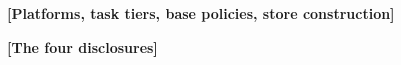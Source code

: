 \documentclass[letterpaper, 10 pt, conference]{ieeeconf}
\newcommand{\todo}[1]{\textbf{[#1]}}
\begin{document}
\todo{Platforms, task tiers, base policies, store construction}


\todo{The four disclosures}
\end{document}
